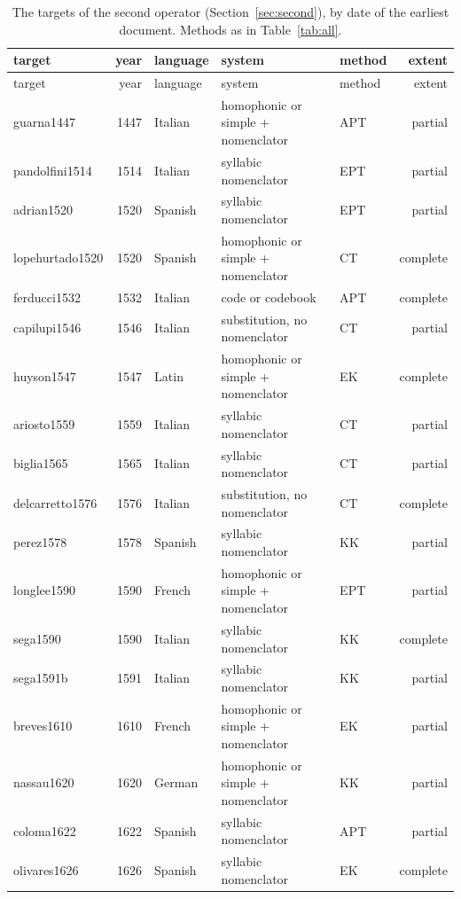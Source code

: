 {\scriptsize
\begin{longtable}{@{}lrlllr@{}}
\caption{\label{tab:allsecond} The targets of the second operator (Section~\ref{sec:second}), by date of the earliest document. Methods as in Table~\ref{tab:all}.}\\
\toprule
target & year & language & system & method & extent \\
\midrule
\endfirsthead
\toprule
target & year & language & system & method & extent \\
\midrule
\endhead
\bottomrule
\endlastfoot
guarna1447 & 1447 & Italian & homophonic or simple + nomenclator & APT & partial \\
pandolfini1514 & 1514 & Italian & syllabic nomenclator & EPT & partial \\
adrian1520 & 1520 & Spanish & syllabic nomenclator & EPT & partial \\
lopehurtado1520 & 1520 & Spanish & homophonic or simple + nomenclator & CT & complete \\
ferducci1532 & 1532 & Italian & code or codebook & APT & complete \\
capilupi1546 & 1546 & Italian & substitution, no nomenclator & CT & partial \\
huyson1547 & 1547 & Latin & homophonic or simple + nomenclator & EK & complete \\
ariosto1559 & 1559 & Italian & syllabic nomenclator & CT & partial \\
biglia1565 & 1565 & Italian & syllabic nomenclator & CT & partial \\
delcarretto1576 & 1576 & Italian & substitution, no nomenclator & CT & complete \\
perez1578 & 1578 & Spanish & syllabic nomenclator & KK & partial \\
longlee1590 & 1590 & French & homophonic or simple + nomenclator & EPT & partial \\
sega1590 & 1590 & Italian & syllabic nomenclator & KK & complete \\
sega1591b & 1591 & Italian & syllabic nomenclator & KK & partial \\
breves1610 & 1610 & French & homophonic or simple + nomenclator & EK & partial \\
nassau1620 & 1620 & German & homophonic or simple + nomenclator & KK & partial \\
coloma1622 & 1622 & Spanish & syllabic nomenclator & APT & partial \\
olivares1626 & 1626 & Spanish & syllabic nomenclator & EK & complete \\

\end{longtable}}
